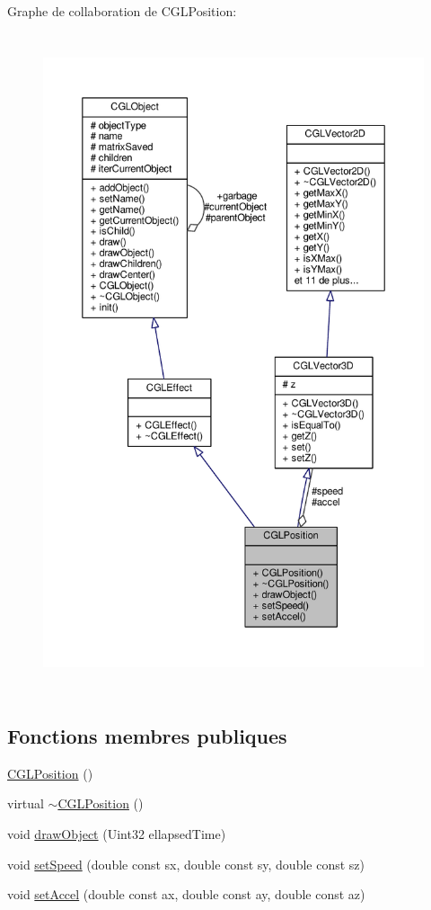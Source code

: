 Graphe de collaboration de C\-G\-L\-Position\-:
\nopagebreak
\begin{figure}[H]
\begin{center}
\leavevmode
\includegraphics[height=550pt]{df/df1/class_c_g_l_position__coll__graph}
\end{center}
\end{figure}
\subsection*{Fonctions membres publiques}
\begin{DoxyCompactItemize}
\item 
\hyperlink{class_c_g_l_position_ab32bdd49fc31414e874917568e5d37d2}{C\-G\-L\-Position} ()
\item 
virtual \hyperlink{class_c_g_l_position_afe1ee045b528494d23286adf06aecae0}{$\sim$\-C\-G\-L\-Position} ()
\item 
void \hyperlink{class_c_g_l_position_a439ae873ba7ef56826a27eb7b15b0b6f}{draw\-Object} (Uint32 ellapsed\-Time)
\item 
void \hyperlink{class_c_g_l_position_a729e7b3f01b8c735d60d8c51b6610eef}{set\-Speed} (double const sx, double const sy, double const sz)
\item 
void \hyperlink{class_c_g_l_position_a5a43a8991d3d8ca645edbcfb0e97db20}{set\-Accel} (double const ax, double const ay, double const az)
\end{DoxyCompactItemize}
